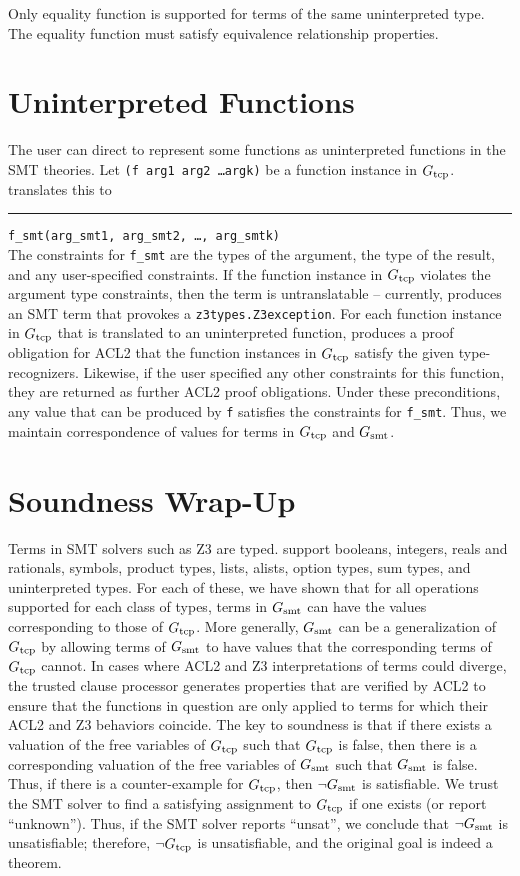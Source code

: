 Only equality function is supported for terms of the same uninterpreted type.
The equality function must satisfy equivalence relationship properties.

\section{Uninterpreted Functions}\label{sec:sounduninterfun}
The user can direct \smtlink{} to represent some functions as uninterpreted functions
in the SMT theories.  Let \texttt{(f arg1 arg2 \ldots argk)} be a function instance
in $G_{\mathrm{tcp}}$.  \smtlink translates this to\\
\rule{2em}{0ex}\texttt{f\_smt(arg\_smt1, arg\_smt2, \ldots, arg\_smtk)}\\
The constraints for \texttt{f\_smt} are the types of the argument, the type of the
result, and any user-specified constraints.
If the function instance in $G_{\mathrm{tcp}}$ violates the argument type constraints, then
the term is untranslatable -- currently, \smtlink{} produces an SMT term
that provokes a \texttt{z3types.Z3exception}.
For each function instance in $G_{\mathrm{tcp}}$ that is translated to an uninterpreted function,
\smtlink{} produces a proof obligation for ACL2 that the function instances in
$G_{\mathrm{tcp}}$ satisfy the given type-recognizers.  Likewise, if the user specified
any other constraints for this function, they are returned as further ACL2 proof
obligations.
Under these preconditions, any value that can be produced by \texttt{f} satisfies the
constraints for \texttt{f\_smt}.
Thus, we maintain correspondence of values for terms in $G_{\mathrm{tcp}}$ and $G_{\mathrm{smt}}$.

\section{Soundness Wrap-Up}\label{sec:soundconcl}
Terms in SMT solvers such as Z3 are typed.  \smtlink{} support booleans, integers,
reals and rationals, symbols, product types, lists, alists, option types, sum
types, and uninterpreted types.  For each of these, we have shown that for all
operations supported for each class of types, terms in $G_{\mathrm{smt}}$ can have the
values corresponding to those of $G_{\mathrm{tcp}}$. 
More generally, $G_{\mathrm{smt}}$ can be a generalization of $G_{\mathrm{tcp}}$ by allowing terms of
$G_{\mathrm{smt}}$ to have values that the corresponding terms of $G_{\mathrm{tcp}}$ cannot.
In cases where ACL2 and Z3 interpretations of terms could diverge, the
trusted clause processor generates properties that are verified by ACL2 to
ensure that the functions in question are only applied to terms for which their
ACL2 and Z3 behaviors coincide.
The key to soundness is that if there exists a valuation of the free variables
of $G_{\mathrm{tcp}}$ such that $G_{\mathrm{tcp}}$ is false, then there is a corresponding valuation
of the free variables of $G_{\mathrm{smt}}$ such that $G_{\mathrm{smt}}$ is false.  Thus, if there
is a counter-example for $G_{\mathrm{tcp}}$, then $\neg G_{\mathrm{smt}}$ is satisfiable.  We trust
the SMT solver to find a satisfying assignment to $G_{\mathrm{tcp}}$ if one exists (or
report ``unknown'').  Thus, if the SMT solver reports ``unsat'', we conclude
that $\neg G_{\mathrm{smt}}$ is unsatisfiable; therefore, $\neg G_{\mathrm{tcp}}$ is unsatisfiable, and
the original goal is indeed a theorem.

